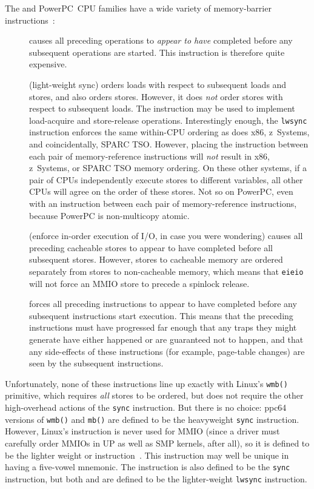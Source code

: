 The \Power{} and PowerPC\mytextregistered\
CPU families have a wide variety of memory-barrier
instructions~\cite{PowerPC94,MichaelLyons05a}:
\begin{description}
\item	[] causes all preceding operations to {\em appear to have}
	completed before any subsequent operations are started.
	This instruction is therefore quite expensive.
\item	[] (light-weight sync) orders loads with respect to
	subsequent loads and stores, and also orders stores.
	However, it does {\em not} order stores with respect to subsequent
	loads.
	The  instruction may be used to implement
	load-acquire and store-release operations.
	Interestingly enough, the {\tt lwsync} instruction enforces
	the same within-CPU ordering as does x86, z~Systems, and coincidentally,
	SPARC TSO.
	However, placing the  instruction between each
	pair of memory-reference instructions will \emph{not}
	result in x86, z~Systems, or SPARC TSO memory ordering.
	On these other systems, if a pair of CPUs independently execute
	stores to different variables, all other CPUs will agree on the
	order of these stores.
	Not so on PowerPC, even with an  instruction between each
	pair of memory-reference instructions, because PowerPC is
	non-multicopy atomic.
\item	[] (enforce in-order execution of I/O, in case you
	were wondering) causes all preceding cacheable stores to appear
	to have completed before all subsequent stores.
	However, stores to cacheable memory are ordered separately from
	stores to non-cacheable memory, which means that {\tt eieio}
	will not force an MMIO store to precede a spinlock release.
\item	[] forces all preceding instructions to appear to have
	completed before any subsequent instructions start execution.
	This means that the preceding instructions must have progressed
	far enough that any traps they might generate have either happened
	or are guaranteed not to happen, and that any side-effects of
	these instructions (for example, page-table changes) are seen by the
	subsequent instructions.
\end{description}

Unfortunately, none of these instructions line up exactly with Linux's
{\tt wmb()} primitive, which requires {\em all} stores to be ordered,
but does not require the other high-overhead actions of the {\tt sync}
instruction.
But there is no choice: ppc64 versions of {\tt wmb()} and {\tt mb()} are
defined to be the heavyweight {\tt sync} instruction.
However, Linux's  instruction is never used for MMIO
(since a driver must carefully order MMIOs in UP as well as
SMP kernels, after all), so it is defined to be the lighter weight
\co{eieio} or \co{lwsync} instruction~\cite{PaulEMcKenney2016LinuxKernelMMIO}.
This instruction may well be unique in having a five-vowel mnemonic.
The \co{smp_mb()} instruction is also defined to be the {\tt sync}
instruction, but both \co{smp_rmb()} and \co{rmb()} are defined to
be the lighter-weight {\tt lwsync} instruction.

